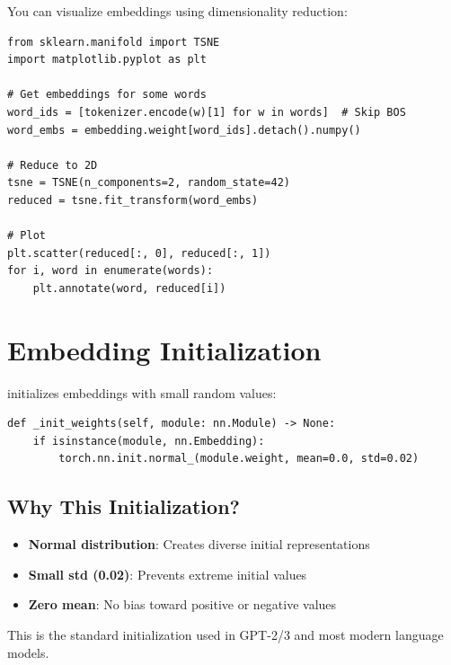 You can visualize embeddings using dimensionality reduction:

\begin{lstlisting}[style=python]
from sklearn.manifold import TSNE
import matplotlib.pyplot as plt

# Get embeddings for some words
word_ids = [tokenizer.encode(w)[1] for w in words]  # Skip BOS
word_embs = embedding.weight[word_ids].detach().numpy()

# Reduce to 2D
tsne = TSNE(n_components=2, random_state=42)
reduced = tsne.fit_transform(word_embs)

# Plot
plt.scatter(reduced[:, 0], reduced[:, 1])
for i, word in enumerate(words):
    plt.annotate(word, reduced[i])
\end{lstlisting}

\section{Embedding Initialization}

\TryLM initializes embeddings with small random values:

\begin{lstlisting}[style=python, caption={Weight initialization from model.py}]
def _init_weights(self, module: nn.Module) -> None:
    if isinstance(module, nn.Embedding):
        torch.nn.init.normal_(module.weight, mean=0.0, std=0.02)
\end{lstlisting}

\subsection{Why This Initialization?}

\begin{itemize}
    \item \textbf{Normal distribution}: Creates diverse initial representations
    \item \textbf{Small std (0.02)}: Prevents extreme initial values
    \item \textbf{Zero mean}: No bias toward positive or negative values
\end{itemize}

This is the standard initialization used in GPT-2/3 and most modern language models.

